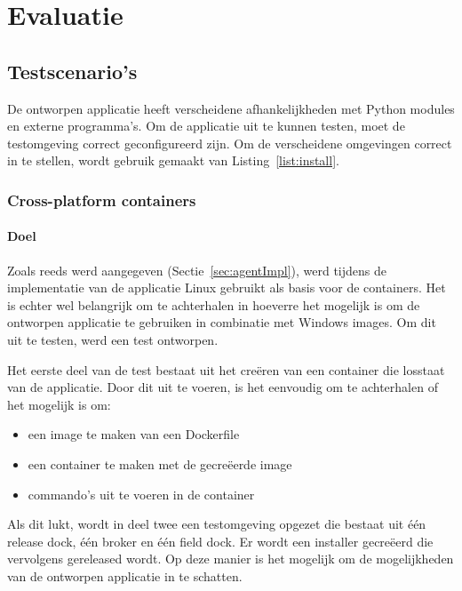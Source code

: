 \chapter{Evaluatie}
\section{Testscenario's}
De ontworpen applicatie heeft verscheidene afhankelijkheden met Python modules en externe programma's.
Om de applicatie uit te kunnen testen, moet de testomgeving correct geconfigureerd zijn.
Om de verscheidene omgevingen correct in te stellen, wordt gebruik gemaakt van Listing~\ref{list:install}.

\subsection{Cross-platform containers}
\subsubsection{Doel}
Zoals reeds werd aangegeven (Sectie~\ref{sec:agentImpl}), werd tijdens de implementatie van de applicatie Linux gebruikt als basis voor de containers.
Het is echter wel belangrijk om te achterhalen in hoeverre het mogelijk is om de ontworpen applicatie te gebruiken in combinatie met Windows images.
Om dit uit te testen, werd een test ontworpen.

Het eerste deel van de test bestaat uit het creëren van een container die losstaat van de applicatie.
Door dit uit te voeren, is het eenvoudig om te achterhalen of het mogelijk is om:
\begin{itemize}
\item een image te maken van een Dockerfile
\item een container te maken met de gecreëerde image
\item commando's uit te voeren in de container
\end{itemize}
Als dit lukt, wordt in deel twee een testomgeving opgezet die bestaat uit één release dock, één broker en één field dock.
Er wordt een installer gecreëerd die vervolgens gereleased wordt.
Op deze manier is het mogelijk om de mogelijkheden van de ontworpen applicatie in te schatten.

